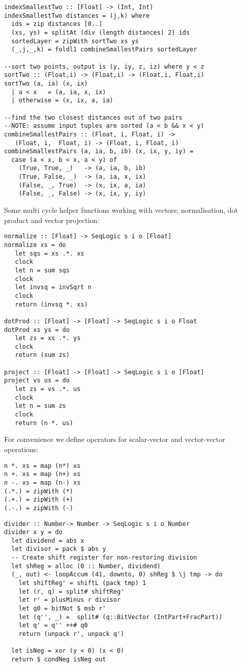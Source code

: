 \documentclass[preprint]{sigplanconf}
\begin{document}
\begin{lstlisting}
indexSmallestTwo :: [Float] -> (Int, Int)
indexSmallestTwo distances = (j,k) where
  ids = zip distances [0..]
  (xs, ys) = splitAt (div (length distances) 2) ids
  sortedLayer = zipWith sortTwo xs ys 
  (_,j,_,k) = foldl1 combineSmallestPairs sortedLayer

--sort two points, output is (y, iy, z, iz) where y < z
sortTwo :: (Float,i) -> (Float,i) -> (Float,i, Float,i)
sortTwo (a, ia) (x, ix) 
  | a < x   = (a, ia, x, ix)
  | otherwise = (x, ix, a, ia) 

--find the two closest distances out of two pairs 
--NOTE: assume input tuples are sorted (a < b && x < y)
combineSmallestPairs :: (Float, i, Float, i) ->
   (Float, i,  Float, i) -> (Float, i, Float, i)
combineSmallestPairs (a, ia, b, ib) (x, ix, y, iy) =
  case (a < x, b < x, a < y) of 
    (True, True, _)   -> (a, ia, b, ib)
    (True, False, _)  -> (a, ia, x, ix)
    (False, _, True)  -> (x, ix, a, ia)
    (False, _, False) -> (x, ix, y, iy)
\end{lstlisting}

Some multi cycle helper functions working with vectors; normalisation, dot product and vector projection:
\begin{lstlisting}
normalize :: [Float] -> SeqLogic s i o [Float]
normalize xs = do
   let sqs = xs .*. xs
   clock
   let n = sum sqs
   clock
   let invsq = invSqrt n
   clock
   return (invsq *. xs)

dotProd :: [Float] -> [Float] -> SeqLogic s i o Float
dotProd xs ys = do
   let zs = xs .*. ys
   clock
   return (sum zs)

project :: [Float] -> [Float] -> SeqLogic s i o [Float]
project vs us = do
   let zs = vs .*. us
   clock
   let n = sum zs
   clock
   return (n *. us)
\end{lstlisting}

For convenience we define operators for scalar-vector and vector-vector operations:
\begin{lstlisting}
n *. xs = map (n*) xs
n +. xs = map (n+) xs
n -. xs = map (n-) xs
(.*.) = zipWith (*)
(.+.) = zipWith (+)
(.-.) = zipWith (-)
\end{lstlisting}

\begin{lstlisting}
divider :: Number-> Number -> SeqLogic s i o Number
divider x y = do
  let dividend = abs x
  let divisor = pack $ abs y
  -- Create shift register for non-restoring division
  let shReg = alloc (0 :: Number, dividend)
  (_, out) <- loopAccum (41, downto, 0) shReg $ \j tmp -> do
    let shiftReg' = shiftL (pack tmp) 1
    let (r, q) = split# shiftReg'
    let r' = plusMinus r divisor
    let q0 = bitNot $ msb r'
    let (q'', _) =  split# (q::BitVector (IntPart+FracPart))
    let q' = q'' ++# q0
    return (unpack r', unpack q')

  let isNeg = xor (y < 0) (x < 0)
  return $ condNeg isNeg out
\end{lstlisting}
\end{document}
